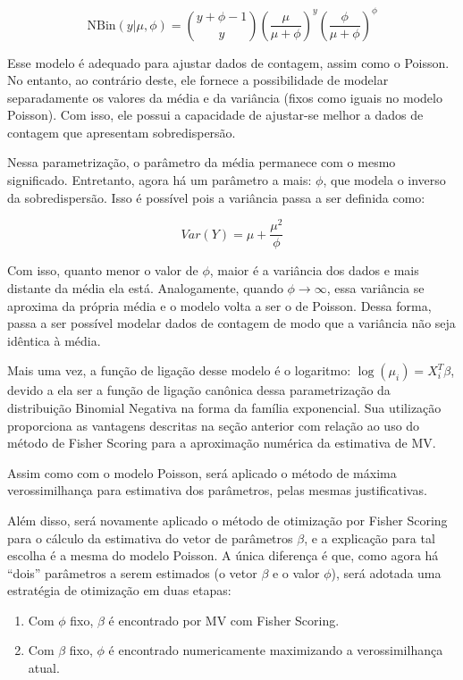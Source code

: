 \documentclass[
]{article}
\providecommand{\tightlist}{%
  \setlength{\itemsep}{0pt}\setlength{\parskip}{0pt}}
\begin{document}
\[
\text{NBin}(y | \mu, \phi) = \binom{y+\phi-1}{y} \left(\dfrac{\mu}{\mu+\phi}\right)^y \left(\dfrac{\phi}{\mu+\phi}\right)^\phi
\]

Esse modelo é adequado para ajustar dados de contagem, assim como o
Poisson. No entanto, ao contrário deste, ele fornece a possibilidade de
modelar separadamente os valores da média e da variância (fixos como
iguais no modelo Poisson). Com isso, ele possui a capacidade de
ajustar-se melhor a dados de contagem que apresentam sobredispersão.

Nessa parametrização, o parâmetro da média permanece com o mesmo
significado. Entretanto, agora há um parâmetro a mais: \(\phi\), que
modela o inverso da sobredispersão. Isso é possível pois a variância
passa a ser definida como:

\[
Var(Y) = \mu + \dfrac{\mu^2}{\phi}
\]

Com isso, quanto menor o valor de \(\phi\), maior é a variância dos
dados e mais distante da média ela está. Analogamente, quando
\(\phi \rightarrow \infty\), essa variância se aproxima da própria média
e o modelo volta a ser o de Poisson. Dessa forma, passa a ser possível
modelar dados de contagem de modo que a variância não seja idêntica à
média.

Mais uma vez, a função de ligação desse modelo é o logaritmo:
\(\log(\mu_i) = X_i^T\beta\), devido a ela ser a função de ligação
canônica dessa parametrização da distribuição Binomial Negativa na forma
da família exponencial. Sua utilização proporciona as vantagens
descritas na seção anterior com relação ao uso do método de Fisher
Scoring para a aproximação numérica da estimativa de MV.

Assim como com o modelo Poisson, será aplicado o método de máxima
verossimilhança para estimativa dos parâmetros, pelas mesmas
justificativas.

Além disso, será novamente aplicado o método de otimização por Fisher
Scoring para o cálculo da estimativa do vetor de parâmetros \(\beta\), e
a explicação para tal escolha é a mesma do modelo Poisson. A única
diferença é que, como agora há ``dois'' parâmetros a serem estimados (o
vetor \(\beta\) e o valor \(\phi\)), será adotada uma estratégia de
otimização em duas etapas:

\begin{enumerate}
\def\labelenumi{\arabic{enumi}.}
\tightlist
\item
  Com \(\phi\) fixo, \(\beta\) é encontrado por MV com Fisher Scoring.
\item
  Com \(\beta\) fixo, \(\phi\) é encontrado numericamente maximizando a
  verossimilhança atual.
\end{enumerate}
\end{document}
